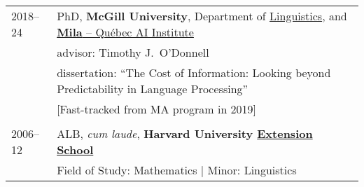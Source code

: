 \documentclass[11pt,a4paper]{article}
\begin{document}
\begin{longtable}{p{1.7cm}|p{15cm}}
  2018--24%
    &PhD,
     \textbf{McGill University},
     Department of \href{https://www.mcgill.ca/linguistics/graduate}{Linguistics}, and
     \href{https://mila.quebec}{\textbf{Mila} -- Québec AI Institute}\\
    &\quad{}advisor: Timothy J.\ O'Donnell\\
    &\quad{}dissertation:
      ``The Cost of Information:
       Looking beyond Predictability in Language Processing''\\
    &[Fast-tracked from MA program in 2019]\\
    \multicolumn{2}{c}{}\\
  2006--12%
      &ALB, \emph{cum laude},
     \textbf{Harvard University \href{https://extension.harvard.edu/}{Extension
     School}}\\
    &\quad{}Field of Study: Mathematics | Minor: Linguistics
  \end{longtable}
\end{document}
